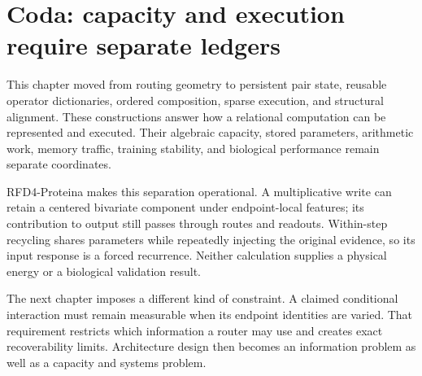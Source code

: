 \section*{Coda: capacity and execution require separate ledgers}

This chapter moved from routing geometry to persistent pair state, reusable operator dictionaries,
ordered composition, sparse execution, and structural alignment.  These constructions answer how
a relational computation can be represented and executed.  Their algebraic capacity, stored
parameters, arithmetic work, memory traffic, training stability, and biological performance remain
separate coordinates.

RFD4-Proteina makes this separation operational.  A multiplicative write can retain a centered
bivariate component under endpoint-local features; its contribution to output still passes through
routes and readouts.  Within-step recycling shares parameters while repeatedly injecting the
original evidence, so its input response is a forced recurrence.  Neither calculation supplies a
physical energy or a biological validation result.

The next chapter imposes a different kind of constraint.  A claimed conditional interaction must
remain measurable when its endpoint identities are varied.  That requirement restricts which
information a router may use and creates exact recoverability limits.  Architecture design then
becomes an information problem as well as a capacity and systems problem.
